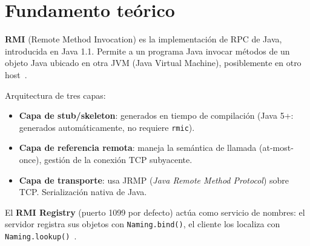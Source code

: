 \documentclass[12pt, a4paper, openany]{book}
\newcommand{\code}[1]{\texttt{\small#1}}
\begin{document}
	\section{Fundamento teórico}
	
	\textbf{RMI} (Remote Method Invocation) es la implementación de RPC de Java,
	introducida en Java 1.1. Permite a un programa Java invocar métodos de un objeto
	Java ubicado en otra JVM (Java Virtual Machine), posiblemente en otro host~\parencite{waldo1994}.
	
	Arquitectura de tres capas:
	\begin{itemize}
		\item \textbf{Capa de stub/skeleton}: generados en tiempo de compilación
		(Java 5+: generados automáticamente, no requiere \code{rmic}).
		\item \textbf{Capa de referencia remota}: maneja la semántica de llamada
		(at-most-once), gestión de la conexión TCP subyacente.
		\item \textbf{Capa de transporte}: usa JRMP (\textit{Java Remote Method Protocol})
		sobre TCP. Serialización nativa de Java.
	\end{itemize}
	
	El \textbf{RMI Registry} (puerto 1099 por defecto) actúa como servicio de
	nombres: el servidor registra sus objetos con \code{Naming.bind()},
	el cliente los localiza con \code{Naming.lookup()}~\parencite{vanSteen2023}.
	
\end{document}
